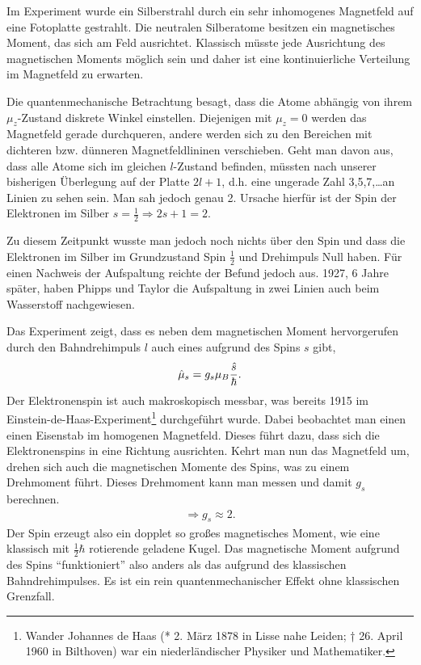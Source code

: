 Im Experiment wurde ein Silberstrahl durch ein sehr inhomogenes Magnetfeld
auf eine Fotoplatte gestrahlt. Die neutralen Silberatome besitzen ein
magnetisches Moment, das sich am Feld ausrichtet. Klassisch müsste jede
Ausrichtung des magnetischen Moments möglich sein und daher ist eine
kontinuierliche Verteilung im Magnetfeld zu erwarten.

Die quantenmechanische Betrachtung besagt, dass die Atome abhängig von ihrem 
$\mu_z$-Zustand diskrete Winkel einstellen. Diejenigen mit $\mu_z = 0$ werden
das Magnetfeld gerade durchqueren, andere werden sich zu den Bereichen
mit dichteren bzw. dünneren Magnetfeldlininen verschieben. Geht man davon aus,
dass alle Atome sich im gleichen $l$-Zustand befinden, müssten nach unserer
bisherigen Überlegung auf der Platte $2l+1$, d.h. eine ungerade Zahl
3,5,7,\ldots an Linien zu sehen sein. Man sah jedoch genau 2. Ursache hierfür
ist der Spin der Elektronen im Silber $s=\frac{1}{2}\Rightarrow 2s+1 = 2$.

Zu diesem Zeitpunkt wusste man jedoch noch nichts über den Spin und dass die
Elektronen im Silber im Grundzustand Spin $\frac{1}{2}$ und Drehimpuls Null
haben. Für einen Nachweis der Aufspaltung reichte der Befund jedoch aus. 1927,
6 Jahre später, haben Phipps und Taylor die Aufspaltung in zwei Linien auch
beim Wasserstoff nachgewiesen.


Das Experiment zeigt, dass es neben dem magnetischen Moment hervorgerufen durch
den Bahndrehimpuls $l$ auch eines aufgrund des Spins $s$ gibt,
\begin{align*}
\hat{\boldmath{\mu}}_s = g_s \mu_B \frac{\hat{\boldmath{s}}}{\hbar}.
\end{align*}
Der Elektronenspin ist auch makroskopisch messbar, was bereits 1915 im
Einstein-de-Haas-Experiment\footnote{Wander Johannes de Haas (* 2. März 1878 in
Lisse nahe Leiden; † 26. April 1960 in Bilthoven) war ein niederländischer
Physiker und Mathematiker.} durchgeführt wurde. Dabei beobachtet man einen
einen Eisenstab im homogenen Magnetfeld. Dieses führt dazu, dass sich die
Elektronenspins in eine Richtung ausrichten. Kehrt man nun das Magnetfeld um,
drehen sich auch die magnetischen Momente des Spins, was zu einem Drehmoment
führt. Dieses Drehmoment kann man messen und damit $g_s$ berechnen.
\begin{align*}
\Rightarrow g_s \approx 2.
\end{align*}
Der Spin erzeugt also ein dopplet so großes magnetisches Moment, wie eine
klassisch mit $\frac{1}{2}\hbar$ rotierende geladene Kugel.  Das magnetische
Moment aufgrund des Spins ``funktioniert'' also anders als das aufgrund des
klassischen Bahndrehimpulses. Es ist ein rein quantenmechanischer Effekt ohne
klassischen Grenzfall.

